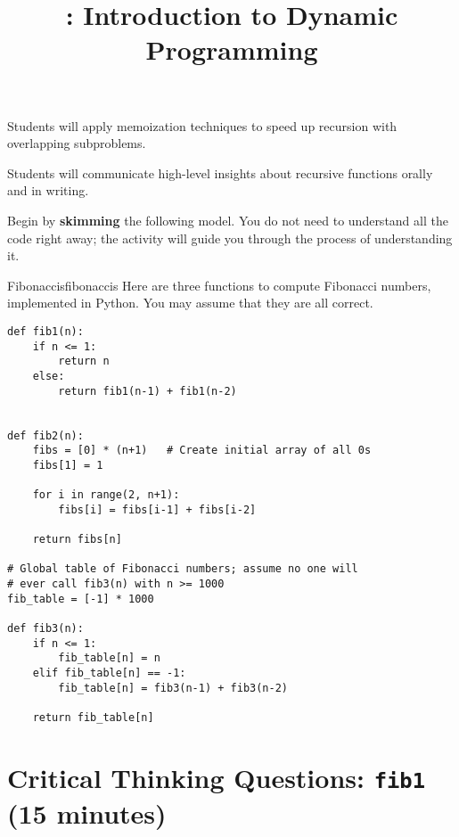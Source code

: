\documentclass{tufte-handout}
\title{\thecourse: Introduction to Dynamic Programming}
\date{}
\begin{document}
\maketitle

\begin{objective}
  Students will apply memoization techniques to speed up recursion
  with overlapping subproblems.
\end{objective}

\begin{pobjective}
  Students will communicate high-level insights about recursive
  functions orally and in writing.
\end{pobjective}

Begin by \textbf{skimming} the following model.  You do not need to
understand all the code right away; the activity will guide you
through the process of understanding it.

\begin{model}{Fibonaccis}{fibonaccis}
Here are three functions to compute Fibonacci numbers, implemented in
Python.  You may assume that they are all correct.

\begin{verbatim}
def fib1(n):
    if n <= 1:
        return n
    else:
        return fib1(n-1) + fib1(n-2)


def fib2(n):
    fibs = [0] * (n+1)   # Create initial array of all 0s
    fibs[1] = 1

    for i in range(2, n+1):
        fibs[i] = fibs[i-1] + fibs[i-2]

    return fibs[n]

# Global table of Fibonacci numbers; assume no one will
# ever call fib3(n) with n >= 1000
fib_table = [-1] * 1000

def fib3(n):
    if n <= 1:
        fib_table[n] = n
    elif fib_table[n] == -1:
        fib_table[n] = fib3(n-1) + fib3(n-2)

    return fib_table[n]
\end{verbatim}
\end{model}

\section{Critical Thinking Questions: \texttt{fib1} (15 minutes)}
\end{document}
